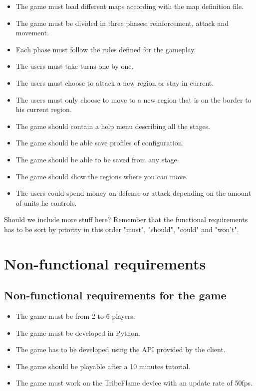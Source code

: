 \documentclass[12pt,a4paper]{article}
\begin{document}
\begin{itemize}
\item The game must load different maps according with the map definition
  file.
\item The game must be divided in three phases: reinforcement, attack
  and movement.
\item Each phase must follow the rules defined for the gameplay.
\item The users must take turns one by one.
\item The users must choose to attack a new region or stay in current.
\item The users must only choose to move to a new region that is on the
  border to his current region.
\item The game should contain a help menu describing all the stages.
\item The game should be able save profiles of configuration.
\item The game should be able to be saved from any stage.
\item The game should show the regions where you can move.
\item The users could spend money on defense or attack depending on the
  amount of units he controls.
\end{itemize}

\begin{todo}[Alberto]
  Should we include more stuff here? Remember that the functional
  requirements has to be sort by priority in this order "must", "should",
  "could" and "won't".
\end{todo}

\section{Non-functional requirements}

\subsection{Non-functional requirements for the game}

\begin{itemize}
\item The game must be from 2 to 6 players.
\item The game must be developed in Python.
\item The game has to be developed using the API provided by the client.
\item The game should be playable after a 10 minutes tutorial.
\item The game must work on the TribeFlame device with an update rate
  of 50fps.
\end{itemize}
\end{document}
